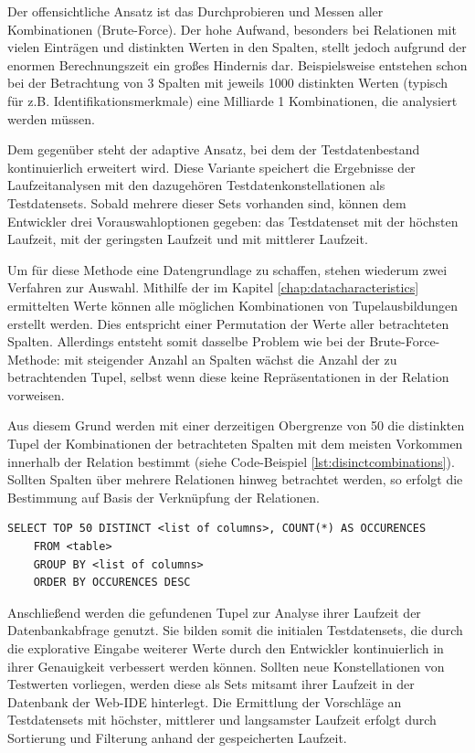 Der offensichtliche Ansatz ist das Durchprobieren und Messen aller Kombinationen (Brute-Force).
Der hohe Aufwand, besonders bei Relationen mit vielen Einträgen und distinkten Werten in den Spalten, stellt jedoch aufgrund der enormen Berechnungszeit ein großes Hindernis dar.
Beispielsweise entstehen schon bei der Betrachtung von 3 Spalten mit jeweils 1000 distinkten Werten (typisch für z.B. Identifikationsmerkmale) eine Milliarde 1 Kombinationen, die analysiert werden müssen.

Dem gegenüber steht der adaptive Ansatz, bei dem der Testdatenbestand kontinuierlich erweitert wird.
Diese Variante speichert die Ergebnisse der Laufzeitanalysen mit den dazugehören Testdatenkonstellationen als Testdatensets.
Sobald mehrere dieser Sets vorhanden sind, können dem Entwickler drei Vorauswahloptionen gegeben: das Testdatenset mit der höchsten Laufzeit, mit der geringsten Laufzeit und mit mittlerer Laufzeit.

Um für diese Methode eine Datengrundlage zu schaffen, stehen wiederum zwei Verfahren zur Auswahl.
Mithilfe der im Kapitel \ref{chap:datacharacteristics} ermittelten Werte können alle möglichen Kombinationen von Tupelausbildungen erstellt werden.
Dies entspricht einer Permutation der Werte aller betrachteten Spalten.
Allerdings entsteht somit dasselbe Problem wie bei der Brute-Force-Methode: mit steigender Anzahl an Spalten wächst die Anzahl der zu betrachtenden Tupel, selbst wenn diese keine Repräsentationen in der Relation vorweisen.

Aus diesem Grund werden mit einer derzeitigen Obergrenze von 50 die distinkten Tupel der Kombinationen der betrachteten Spalten mit dem meisten Vorkommen innerhalb der Relation bestimmt (siehe Code-Beispiel \ref{lst:disinctcombinations}).
Sollten Spalten über mehrere Relationen hinweg betrachtet werden, so erfolgt die Bestimmung auf Basis der Verknüpfung der Relationen.

\begin{lstlisting}[caption={Bestimmung distinkter Tupel anhand gegebener Spalten}, label={lst:disinctcombinations}, language=mySQL]
	SELECT TOP 50 DISTINCT <list of columns>, COUNT(*) AS OCCURENCES
	FROM <table>
	GROUP BY <list of columns>
	ORDER BY OCCURENCES DESC
\end{lstlisting}

Anschließend werden die gefundenen Tupel zur Analyse ihrer Laufzeit der Datenbankabfrage genutzt.
Sie bilden somit die initialen Testdatensets, die durch die explorative Eingabe weiterer Werte durch den Entwickler kontinuierlich in ihrer Genauigkeit verbessert werden können.
Sollten neue Konstellationen von Testwerten vorliegen, werden diese als Sets mitsamt ihrer Laufzeit in der Datenbank der Web-IDE hinterlegt.
Die Ermittlung der Vorschläge an Testdatensets mit höchster, mittlerer und langsamster Laufzeit erfolgt durch Sortierung und Filterung anhand der gespeicherten Laufzeit.

